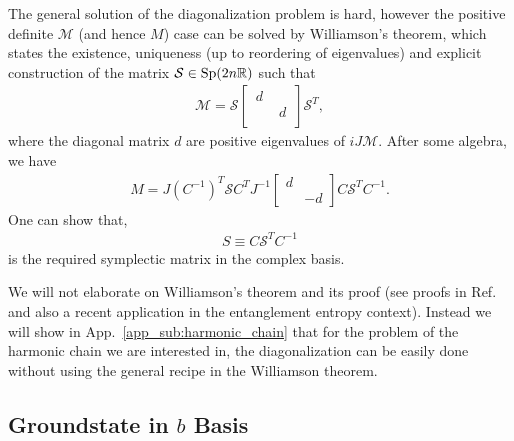 The general solution of the diagonalization problem is hard\cite{arnold_mathematical_2010}, however the positive definite $\mathcal{M}$ (and hence $M$) case can be solved by Williamson's theorem\cite{arnold_mathematical_2010,xiao_theory_2009,pirandola_correlation_2009,gosson_symplectic_2006}, which states the existence, uniqueness (up to reordering of eigenvalues) and explicit construction of the matrix $\mathcal{S}\in {\rm Sp}(2n \mathbb{R}) $ such that 
\begin{equation}\begin{aligned}
\mathcal{M}=\mathcal{S}
\begin{bmatrix}
\, d \, & \\
 & \, d\, \\
\end{bmatrix}
\mathcal{S}^T,
\end{aligned}\end{equation}
where the diagonal matrix $d$ are positive eigenvalues of $iJ\mathcal{M}$. After some algebra, we have
\begin{equation}\begin{aligned}
\label{eq:diagonalization_M}
M=J(C^{-1})^T\mathcal{S}C^TJ^{-1}
\begin{bmatrix}
d\\
&-d
\end{bmatrix}
C\mathcal{S}^TC^{-1}.
\end{aligned}\end{equation}
One can show that,
\begin{equation*}\begin{aligned}
S\equiv C\mathcal{S}^TC^{-1}
\end{aligned}\end{equation*}
is the required symplectic matrix in the complex basis. 

We will not elaborate on Williamson's theorem and its proof (see proofs in Ref.~ and also a recent application in the entanglement entropy context\cite{coser_contour_2017}). Instead we will show in App.~\ref{app_sub:harmonic_chain} that for the problem of the harmonic chain we are interested in, the diagonalization can be easily done without using the general recipe in the Williamson theorem. 


\subsection{Groundstate in $b$ Basis}

